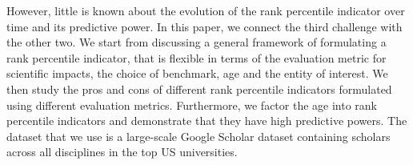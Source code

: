 However, little is known about the evolution of the rank percentile indicator over time and its predictive power. In this paper, we connect the third challenge with the other two. We start from discussing a general framework of formulating a rank percentile indicator, that is flexible in terms of the evaluation metric for scientific impacts, the choice of benchmark, age and the entity of interest. We then study the pros and cons of different rank percentile indicators formulated using different evaluation metrics. Furthermore, we factor the age into rank percentile indicators and demonstrate that they have high predictive powers. The dataset that we use is a large-scale Google Scholar dataset containing scholars across all disciplines in the top US universities.




